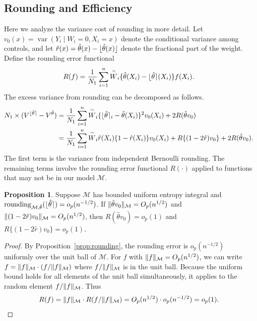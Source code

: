 \documentclass{article}
\DeclarePairedDelimiter\norm{\lVert}{\rVert}
\theoremstyle{definition}
\newtheorem{proposition}[theorem]{Proposition}
\DeclareMathOperator{\Var}{var}
\DeclarePairedDelimiter\round{\lfloor}{\rceil}
\DeclarePairedDelimiter\floor{\lfloor}{\rfloor}
\DeclareMathOperator{\roundingerror}{rounding}
\newcommand{\model}{\mathcal{M}}
\newcommand{\<}{\langle}
\renewcommand{\>}{\rangle}
\begin{document}
\begin{refsection}
\subsection{Rounding and Efficiency}
\label{sec:rounding-and-efficiency}

Here we analyze the variance cost of rounding in more detail. Let $v_0(x) = \Var(Y_i \mid W_i=0, X_i=x)$ denote the conditional variance among controls, and let $\hat r(x) = \hat\theta(x) - \floor{\hat\theta(x)}$ denote the fractional part of the weight. Define the rounding error functional
$$
R(f) = \frac{1}{N_1}\sum_{i=1}^n \overset{\neg}{W}_i \{\hat\theta(X_i) - \round{\hat\theta}(X_i)\} f(X_i).
$$
The excess variance from rounding can be decomposed as follows.
\begin{equation}
\label{eq:rounding-variance-excess}
\begin{aligned}
N_1 \times (V^{\round{\hat\theta}} - V^{\hat\theta})
&= \frac{1}{N_1}\sum_{i=1}^n \overset{\neg}{W}_i \{\round{\hat\theta}_i - \hat\theta(X_i)\}^2 v_0(X_i) + 2R(\hat\theta v_0) \\
&= \frac{1}{N_1}\sum_{i=1}^n \overset{\neg}{W}_i \hat r(X_i)\{1 - \hat r(X_i)\} v_0(X_i) + R\{(1-2\hat r)v_0\} + 2R(\hat\theta v_0).
\end{aligned}
\end{equation}
The first term is the variance from independent Bernoulli rounding. The remaining terms involve the rounding error functional $R(\cdot)$ applied to functions that may not be in our model $\model$.

\begin{proposition}
\label{prop:rounding-efficiency}
Suppose $\model$ has bounded uniform entropy integral and $\roundingerror_{\model,\hat\theta}(\round{\hat\theta}) = o_p(n^{-1/2})$. If $\norm{\hat\theta v_0}_\model = O_p(n^{1/2})$ and $\norm{(1-2\hat r)v_0}_\model = O_p(n^{1/2})$, then $R(\hat\theta v_0) = o_p(1)$ and $R\{(1-2\hat r)v_0\} = o_p(1)$.
\end{proposition}

\begin{proof}
By Proposition~\ref{prop:rounding}, the rounding error is $o_p(n^{-1/2})$ uniformly over the unit ball of $\model$. For $f$ with $\norm{f}_\model = O_p(n^{1/2})$, we can write $f = \norm{f}_\model \cdot (f/\norm{f}_\model)$ where $f/\norm{f}_\model$ is in the unit ball. Because the uniform bound holds for all elements of the unit ball simultaneously, it applies to the random element $f/\norm{f}_\model$. Thus
$$
R(f) = \norm{f}_\model \cdot R(f/\norm{f}_\model) = O_p(n^{1/2}) \cdot o_p(n^{-1/2}) = o_p(1).
$$
\end{proof}


\end{refsection}
\end{document}
